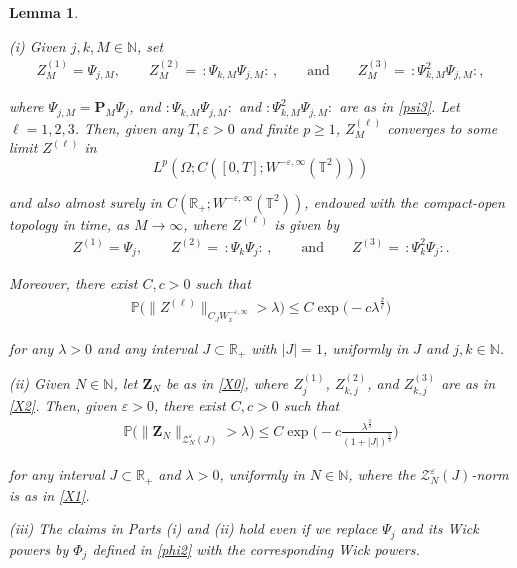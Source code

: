 \documentclass[10pt,a4paper]{amsart}
\newtheorem{lemma}{Lemma}
\newcommand{\N}{\mathbb{N}}
\renewcommand{\O}{\Omega}
\renewcommand{\P}{\mathbf{P}}
\newcommand{\PP}{\mathbb{P}}
\newcommand{\R}{\mathbb{R}}
\newcommand{\T}{\mathbb{T}}
\newcommand{\ZZ}{\mathcal{Z}}
\newcommand{\eps}{\varepsilon}
\renewcommand{\l}{\ell}
\newcommand{\ld}{\lambda}
\newcommand{\noi}{\noindent}
\newcommand{\wick}[1]{:\!{#1}\!:}
\begin{document}
\begin{lemma}
\label{LEM:sto1}

\textup{(i)}
Given %
$j, k, M \in \N$, set 
\begin{align*}
Z_{M}^{(1)} = \Psi_{j, M},\qquad   Z_{M}^{(2)} = \, \wick{\Psi_{k, M} \Psi_{j, M}} \, , 
\qquad \text{and}\qquad 
Z_{M}^{(3)}
=  \, \wick{\Psi_{k, M}^2 \Psi_{j, M}}, 
\end{align*}



\noi
where 
$\Psi_{j, M} = \P_M \Psi_{j}$, 
and
$ \wick{\Psi_{k, M} \Psi_{j, M}} $
and $ \wick{\Psi_{k, M}^2 \Psi_{j, M}}$
are as in 
\eqref{psi3}.
Let $\l = 1, 2, 3$.
Then, 
given any  $T,\eps>0$ and finite $p \geq 1$, 
$  Z^{(\l)}_M$
converges to some limit $Z^{(\l)}$ in 
\[L^p(\O;C([0,T];W^{-\eps,\infty}(\T^2)))\]

\noi
and also almost surely in $C(\R_+;W^{-\eps,\infty}(\T^2))$, 
endowed with the compact-open topology in time, 
as $M \to \infty$, 
where $Z^{(\l)}$ is given by 
\begin{align*}
Z^{(1)} = \Psi_{j},\qquad   Z^{(2)} = \, \wick{\Psi_{k} \Psi_{j}} \, , 
\qquad \text{and}\qquad 
Z^{(3)}
=  \, \wick{\Psi_{k}^2 \Psi_{j}}.
\end{align*}

\noi
Moreover, there exist
  $C, c > 0$ such that 
\begin{align}
\PP \Big( \| Z^{(\l)} \|_{C_{J} W_x^{- \eps, \infty}} > \ld \Big) 
\leq C \exp\big( - c\ld^{\frac{2}{\l}}\big)
\label{tail1}
\end{align}

\noi
for any $\ld > 0$ and any interval $J \subset \R_+$ with $|J| = 1$, 
uniformly in $J$ and $j, k \in \N$.


\smallskip

\noi
\textup{(ii)}
Given $N \in \N$, 
let $\pmb Z_N$ be as in \eqref{X0}, 
where 
$Z_j^{(1)}$,  $Z_{k, j}^{(2)}$, and $Z_{k, j}^{(3)}$
are as in \eqref{X2}.
Then,  given $\eps > 0$, there exist
  $C, c > 0$ such that 
\begin{align}
\PP \Big( \| \pmb Z_N \|_{\ZZ^\eps_N(J)} > \ld \Big) 
\le C %
  \exp\Big( - c\frac{\ld^\frac{2}{3}}{(1 + |J|)^\frac 23 }\Big)
\label{tail2}
\end{align}



\noi
for any 
interval $J \subset \R_+$
and 
$\ld > 0$,  
uniformly in $N \in \N$, 
where the $\ZZ_N^\eps(J)$-norm is as in \eqref{X1}.





\smallskip

\noi
\textup{(iii)}
The claims in Parts (i) and (ii) hold
even if we replace $\Psi_j$ 
and its  Wick powers
by $\Phi_j$
defined in \eqref{phi2} 
with the corresponding Wick powers.


\end{lemma}
\end{document}
